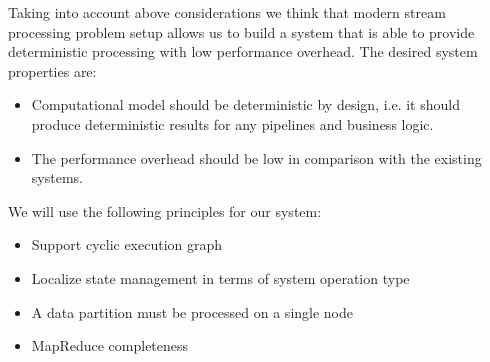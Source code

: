 Taking into account above considerations we think that 
modern stream processing problem setup allows us to build a system that is able to provide deterministic processing with low performance overhead. The desired system properties are:
\begin{itemize}
    \item Computational model should be deterministic by design, i.e. it should produce deterministic results for any pipelines and business logic.
    \item The performance overhead should be low in comparison with the existing systems.
\end{itemize}
We will use the following principles for our system:
\begin{itemize}
    \item Support cyclic execution graph
    \item Localize state management in terms of system operation type
    \item A data partition must be processed on a single node
    \item MapReduce completeness
\end{itemize}
